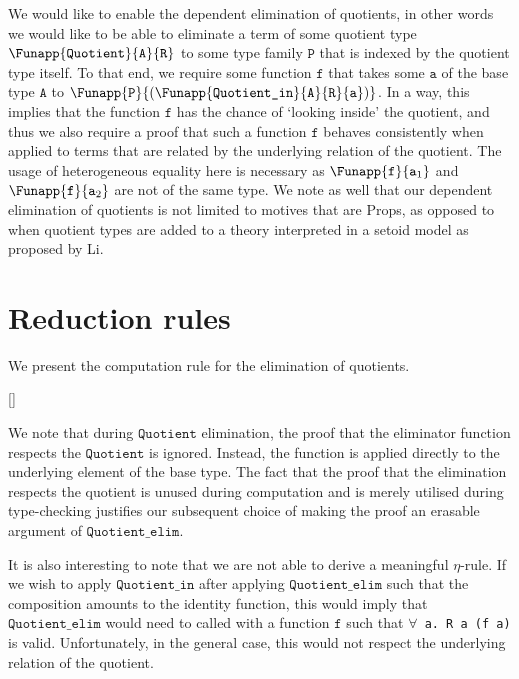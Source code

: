 \documentclass[12pt,twoside,maitrise]{dms}
\theoremstyle{definition}
\numberwithin{equation}{section}
\numberwithin{table}{chapter}
\numberwithin{figure}{chapter}
\newcommand\id[1] {\texttt{#1}}
\newcommand\fn[1] {\texttt{#1}}
\newcommand\type[1] {\textsf{#1}} %
\begin{document}
We would like to enable the dependent elimination of quotients, in other words
we would like to be able to eliminate a term of some quotient type
$\Funapp{\id{Quotient}}{\id{A}}{\id{R}}$ to some type family $\id{P}$ that is
indexed by the quotient type itself. To that end, we require some function
$\id{f}$ that takes some $\id{a}$ of the base type $\id{A}$ to
$\Funapp{\id{P}}{(\Funapp{\id{Quotient\_in}}{\id{A}}{\id{R}}{\id{a}})}$. In a
way, this implies that the function $\id{f}$ has the chance of `looking inside'
the quotient, and thus we also require a proof that such a function $\id{f}$
behaves consistently when applied to terms that are related by the underlying
relation of the quotient. The usage of heterogeneous equality here is necessary
as $\Funapp{\id{f}}{\id{a}_1}$ and $\Funapp{\id{f}}{\id{a}_2}$ are not of the
same type. We note as well that our dependent elimination of quotients is not
limited to motives that are \type{Props}, as opposed to when quotient types are
added to a theory interpreted in a setoid model as proposed by
Li\cite{li2015quotient}.

\section{Reduction rules}
We present the computation rule for the elimination of quotients.

\begin{prooftree*}
   \hypo{\id{q} \rightsquigarrow \Funapp{\id{Quotient\_in}}{\id{A}}{\id{R}}{\id{a}}}
   []{\Funapp{\id{Quotient\_elim}}{\id{A}}{\id{R}}{\id{f}}{\id{h}}{\id{q}}
             \rightsquigarrow \Funapp{\id{f}}{\id{a}}}
\end{prooftree*}

We note that during $\id{Quotient}$ elimination, the proof that the eliminator
function respects the $\id{Quotient}$ is ignored. Instead, the function is
applied directly to the underlying element of the base type. The fact that the
proof that the elimination respects the quotient is unused during computation
and is merely utilised during type-checking justifies our subsequent choice of
making the proof an erasable argument of $\id{Quotient\_elim}$.

It is also interesting to note that we are not able to derive a meaningful
$\eta$-rule. If we wish to apply $\id{Quotient\_in}$ after applying
$\id{Quotient\_elim}$ such that the composition amounts to the identity
function, this would imply that $\id{Quotient\_elim}$ would need to called with
a function $\id{f}$ such that \fn{$\forall$ a. R a (f a)} is valid.
Unfortunately, in the general case, this would not respect the underlying
relation of the quotient.
\end{document}
